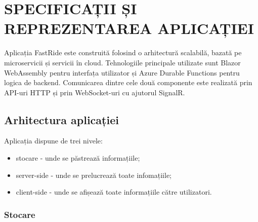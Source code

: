 \chapter{SPECIFICAȚII ȘI REPREZENTAREA APLICAȚIEI}
Aplicația FastRide este construită folosind o arhitectură scalabilă, bazată pe microservicii și servicii în cloud. Tehnologiile principale utilizate sunt Blazor WebAssembly pentru interfața utilizator și Azure Durable Functions pentru logica de backend. Comunicarea dintre cele două componente este realizată prin API-uri HTTP și prin WebSocket-uri cu ajutorul SignalR.

\section{Arhitectura aplicației}
Aplicația dispune de trei nivele:
\begin{itemize}
    \item stocare - unde se păstrează informațiile;
    \item server-side - unde se prelucrează toate infomațiile;
    \item client-side - unde se afișează toate informațiile către utilizatori.
\end{itemize}

\subsection{Stocare}

